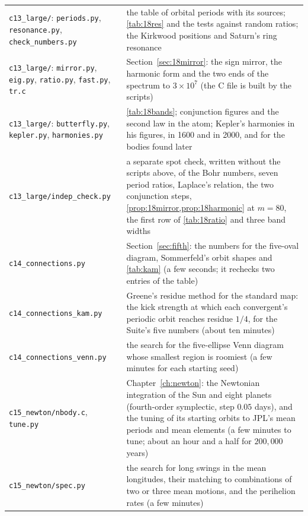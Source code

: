 {\begin{longtable}{@{}>{\raggedright\arraybackslash}p{}>{\raggedright\arraybackslash}p{}@{}}
\texttt{c13\_large/}: \texttt{periods.py}, \texttt{resonance.py}, \texttt{check\_numbers.py} \addedon{\revD} & the table of orbital periods with its sources; \cref{tab:18res} and the tests against random ratios; the Kirkwood positions and Saturn's ring resonance \\
\texttt{c13\_large/}: \texttt{mirror.py}, \texttt{eig.py}, \texttt{ratio.py}, \texttt{fast.py}, \texttt{tr.c} \addedon{\revD} & Section~\ref{sec:18mirror}: the sign mirror, the harmonic form and the two ends of the spectrum to $3\times10^7$ (the C file is built by the scripts) \\
\texttt{c13\_large/}: \texttt{butterfly.py}, \texttt{kepler.py}, \texttt{harmonies.py} \addedon{\revD} & \cref{tab:18bands}; conjunction figures and the second law in the atom; Kepler's harmonies in his figures, in 1600 and in 2000, and for the bodies found later \\
\texttt{c13\_large/indep\_check.py} \addedon{\revD} & a separate spot check, written without the scripts above, of the Bohr numbers, seven period ratios, Laplace's relation, the two conjunction steps, \cref{prop:18mirror,prop:18harmonic} at $m = 80$, the first row of \cref{tab:18ratio} and three band widths \\
\texttt{c14\_connections.py} \addedon{\revE} & Section~\ref{sec:fifth}: the numbers for the five-oval diagram, Sommerfeld's orbit shapes and \cref{tab:kam} (a few seconds; it rechecks two entries of the table) \\
\texttt{c14\_connections\_kam.py} \addedon{\revE} & Greene's residue method for the standard map: the kick strength at which each convergent's periodic orbit reaches residue $1/4$, for the Suite's five numbers (about ten minutes) \\
\texttt{c14\_connections\_venn.py} \addedon{\revE} & the search for the five-ellipse Venn diagram whose smallest region is roomiest (a few minutes for each starting seed) \\
\texttt{c15\_newton/nbody.c}, \texttt{tune.py} \addedon{\revF} & Chapter~\ref{ch:newton}: the Newtonian integration of the Sun and eight planets (fourth-order symplectic, step $0.05$ days), and the tuning of its starting orbits to JPL's mean periods and mean elements (a few minutes to tune; about an hour and a half for $200{,}000$ years) \\
\texttt{c15\_newton/spec.py} \addedon{\revF} & the search for long swings in the mean longitudes, their matching to combinations of two or three mean motions, and the perihelion rates (a few minutes) \\

\end{longtable}}
